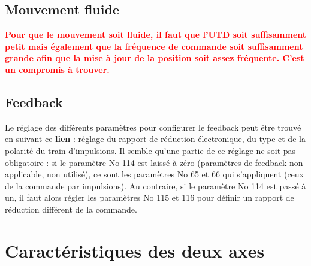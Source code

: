 \documentclass[a4paper,11pt]{beamer}
\begin{document}
\subsection{Mouvement fluide}
\begin{frame}
\justifying
\textbf{\textcolor{red}{Pour que le mouvement soit fluide, il faut que l'UTD soit suffisamment petit mais également que la fréquence de commande soit suffisamment grande afin que la mise à jour de la position soit assez fréquente. C'est un compromis à trouver.}}
\end{frame}

\subsection{Feedback}
\begin{frame}

\justifying	
Le réglage des différents paramètres pour configurer le feedback peut être trouvé en suivant ce 
\textcolor{blue}{\textbf{\underline{\href{https://raw.githubusercontent.com/fbuloup/Interface_IAI/main/Documentation/SCON-CB_CGB(ME0340-8A).pdf\#page=260}{lien}}}} : réglage du rapport de réduction électronique, du type et de la polarité du train d'impulsions. Il semble qu'une partie de ce réglage ne soit pas obligatoire : si le paramètre No 114 est laissé à zéro (paramètres de feedback non applicable, non utilisé), ce sont les paramètres No 65 et 66 qui s'appliquent (ceux de la commande par impulsions). Au contraire, si le paramètre No 114 est passé à un, il faut alors régler les paramètres No 115 et 116 pour définir un rapport de réduction différent de la commande.

\end{frame}

\section{Caractéristiques des deux axes}
\end{document}
